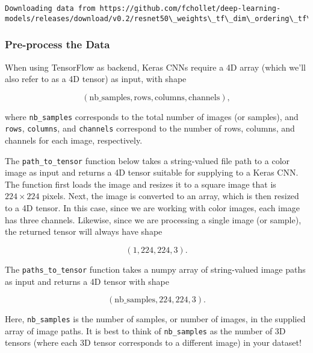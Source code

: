 \documentclass[11pt]{article}
\begin{document}
    \begin{Verbatim}[commandchars=\\\{\}]
Downloading data from https://github.com/fchollet/deep-learning-models/releases/download/v0.2/resnet50\_weights\_tf\_dim\_ordering\_tf\_kernels.h5

    \end{Verbatim}

    \hypertarget{pre-process-the-data}{%
\subsubsection{Pre-process the Data}\label{pre-process-the-data}}

When using TensorFlow as backend, Keras CNNs require a 4D array (which
we'll also refer to as a 4D tensor) as input, with shape

\[
(\text{nb_samples}, \text{rows}, \text{columns}, \text{channels}),
\]

where \texttt{nb\_samples} corresponds to the total number of images (or
samples), and \texttt{rows}, \texttt{columns}, and \texttt{channels}
correspond to the number of rows, columns, and channels for each image,
respectively.

The \texttt{path\_to\_tensor} function below takes a string-valued file
path to a color image as input and returns a 4D tensor suitable for
supplying to a Keras CNN. The function first loads the image and resizes
it to a square image that is \(224 \times 224\) pixels. Next, the image
is converted to an array, which is then resized to a 4D tensor. In this
case, since we are working with color images, each image has three
channels. Likewise, since we are processing a single image (or sample),
the returned tensor will always have shape

\[
(1, 224, 224, 3).
\]

The \texttt{paths\_to\_tensor} function takes a numpy array of
string-valued image paths as input and returns a 4D tensor with shape

\[
(\text{nb_samples}, 224, 224, 3).
\]

Here, \texttt{nb\_samples} is the number of samples, or number of
images, in the supplied array of image paths. It is best to think of
\texttt{nb\_samples} as the number of 3D tensors (where each 3D tensor
corresponds to a different image) in your dataset!
\end{document}
